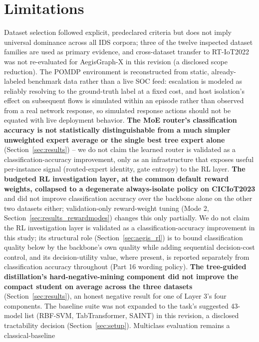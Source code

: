 \documentclass[journal]{IEEEtran}
\begin{document}
\section{Limitations}
\label{sec:limitations}

Dataset selection followed explicit, predeclared criteria but does not imply
universal dominance across all IDS corpora; three of the twelve inspected
dataset families are used as primary evidence, and cross-dataset transfer to
RT-IoT2022 was not re-evaluated for AegisGraph-X in this revision (a
disclosed scope reduction). The POMDP environment is reconstructed from
static, already-labeled benchmark data rather than a live SOC feed:
escalation is modeled as reliably resolving to the ground-truth label at a
fixed cost, and host isolation's effect on subsequent flows is simulated
within an episode rather than observed from a real network response, so
simulated response actions should not be equated with live deployment
behavior. \textbf{The MoE router's classification accuracy is not
statistically distinguishable from a much simpler unweighted expert average
or the single best tree expert alone} (Section~\ref{sec:results}) -- we do
not claim the learned router is validated as a classification-accuracy
improvement, only as an infrastructure that exposes useful per-instance
signal (routed-expert identity, gate entropy) to the RL layer. \textbf{The
budgeted RL investigation layer, at the common default reward weights,
collapsed to a degenerate always-isolate policy on CICIoT2023} and did not
improve classification accuracy over the backbone alone on the other two
datasets either; validation-only reward-weight tuning (Mode 2,
Section~\ref{sec:results_rewardmodes}) changes this only partially. We do not
claim the RL investigation layer is validated as a classification-accuracy
improvement in this study; its structural role (Section~\ref{sec:aegis_rl})
is to bound classification quality below by the backbone's own quality while
adding sequential decision-cost control, and its decision-utility value,
where present, is reported separately from classification accuracy
throughout (Part 16 wording policy). \textbf{The tree-guided distillation's
hard-negative-mining component did not improve the compact student on
average across the three datasets} (Section~\ref{sec:results}), an honest
negative result for one of Layer 3's four components. The baseline suite
was not expanded to the task's suggested 43-model list (RBF-SVM,
TabTransformer, SAINT) in this revision, a disclosed tractability decision
(Section~\ref{sec:setup}). Multiclass evaluation remains a classical-baseline
\end{document}
